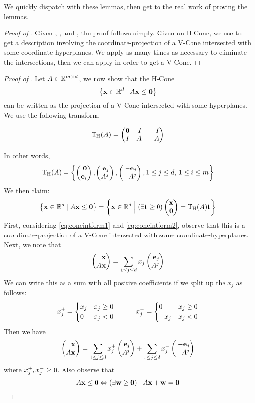 We quickly dispatch  with these lemmas, then get to the real work of proving the lemmas.

\begin{proof}[Proof of ]
	Given , , and , the proof follows simply.  Given an H-Cone, we use  to get a description involving the coordinate-projection of a V-Cone intersected with some coordinate-hyperplanes.  We apply  as many times as necessary to eliminate the intersections, then we can apply  in order to get a V-Cone.
\end{proof}

\begin{proof}[Proof of ]
	Let $A \in \mathbb{R}^{{m}\times d}$, we now show that the H-Cone
	\[\left\{\mathbf{x} \in \mathbb{R}^d \;|\; A\mathbf{x} \leq \mathbf{0}\right\}\]
	can be written as the projection of a V-Cone intersected with some hyperplanes.  We use the following transform.
  \begin{Transform}\label{hconelift_transform}
  \[\HLift(A) = \pmb \0 & I & -I \\ I & A & -A \pme \]
  \end{Transform}
  In other words,
  \[\HLift(A) =  \set{\zei, \eAj, \neAj, 1 \leq j \leq d,\, 1 \leq i \leq m}\]
	We then claim:
	\begin{equation}\label{eq:hliftform}
		\set{\xv \st A\x \leq \0} = \set{\xv \St (\exists \t \geq 0) \xz = \HLift(A)\t}
	\end{equation}
	First, considering \eqref{eq:coneintform1} and \eqref{eq:coneintform2}, observe that this is a coordinate-projection of a V-Cone intersected with some coordinate-hyperplanes.
	Next, we note that
	\[ \xAx = \jsum x_j \eAj \]
	We can write this as a sum with all positive coefficients if we split up the $x_j$ as follows:
	\[
		x_j^+ = \begin{cases} x_j & x_j \geq 0 \\ 0 & x_j < 0 \end{cases} \quad\quad\quad
		x_j^- = \begin{cases} 0 & x_j \geq 0 \\ -x_j & x_j < 0 \end{cases}
	\]
	Then we have
	\begin{equation} \label{eq:xAx}
		\xAx = \jsum \xjp \eAj + \jsum \xjm \neAj
	\end{equation}
	where $x_j^+, x_j^- \geq 0$.  Also observe that
	\[ A\mathbf{x} \leq \mathbf{0} \Leftrightarrow (\exists \mathbf{w} \geq \mathbf{0}) \;|\; A\mathbf{x} + \mathbf{w} = \mathbf{0} \]

\end{proof}
